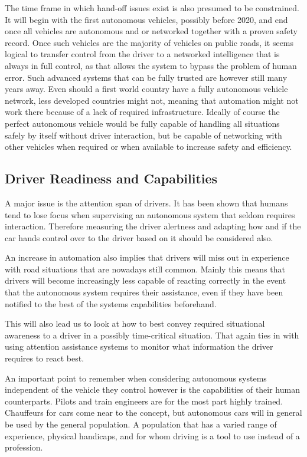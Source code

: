 \documentclass{acm_proc_article-sp}
\begin{document}
The time frame in which hand-off issues exist is also presumed to be constrained.
It will begin with the first autonomous vehicles, possibly before 2020, and end once all vehicles are autonomous and or networked together with a proven safety record.
Once such vehicles are the majority of vehicles on public roads, it seems logical to transfer control from the driver to a networked intelligence that is always in full control, as that allows the system to bypass the problem of human error.
Such advanced systems that can be fully trusted are however still many years away.
Even should a first world country have a fully autonomous vehicle network, less developed countries might not, meaning that automation might not work there because of a lack of required infrastructure.
Ideally of course the perfect autonomous vehicle would be fully capable of handling all situations safely by itself without driver interaction, but be capable of networking with other vehicles when required or when available to increase safety and efficiency.

\subsection{Driver Readiness and Capabilities}

A major issue is the attention span of drivers.
It has been shown that humans tend to lose focus when supervising an autonomous system that seldom requires interaction.
Therefore measuring the driver alertness and adapting how and if the car hands control over to the driver based on it should be considered also.

An increase in automation also implies that drivers will miss out in experience with road situations that are nowadays still common.
Mainly this means that drivers will become increasingly less capable of reacting correctly in the event that the autonomous system requires their assistance, even if they have been notified to the best of the systems capabilities beforehand.

This will also lead us to look at how to best convey required situational awareness to a driver in a possibly time-critical situation.
That again ties in with using attention assistance systems to monitor what information the driver requires to react best.

An important point to remember when considering autonomous systems independent of the vehicle they control however is the capabilities of their human counterparts.
Pilots and train engineers are for the most part highly trained.
Chauffeurs for cars come near to the concept, but autonomous cars will in general be used by the general population.
A population that has a varied range of experience, physical handicaps, and for whom driving is a tool to use instead of a profession.
\end{document}
